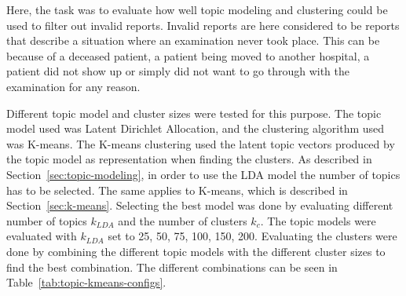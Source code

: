 Here, the task was to evaluate how well topic modeling and clustering could be used to filter out invalid reports.
Invalid reports are here considered to be reports that describe a situation where an examination never took place.
This can be because of a deceased patient, a patient being moved to another hospital, a patient did not show up or simply did not want to go through with the examination for any reason.

Different topic model and cluster sizes were tested for this purpose.
The topic model used was Latent Dirichlet Allocation, and the clustering algorithm used was K-means.
The K-means clustering used the latent topic vectors produced by the topic model as representation when finding the clusters.
As described in Section~\ref{sec:topic-modeling}, in order to use the LDA model the number of topics has to be selected.
The same applies to K-means, which is described in Section~\ref{sec:k-means}.
Selecting the best model was done by evaluating different number of topics $k_{LDA}$ and the number of clusters $k_{c}$.
The topic models were evaluated with $k_{LDA}$ set to 25, 50, 75, 100, 150, 200.
Evaluating the clusters were done by combining the different topic models with the different cluster sizes to find the best combination.
The different combinations can be seen in Table~\ref{tab:topic-kmeans-configs}.
